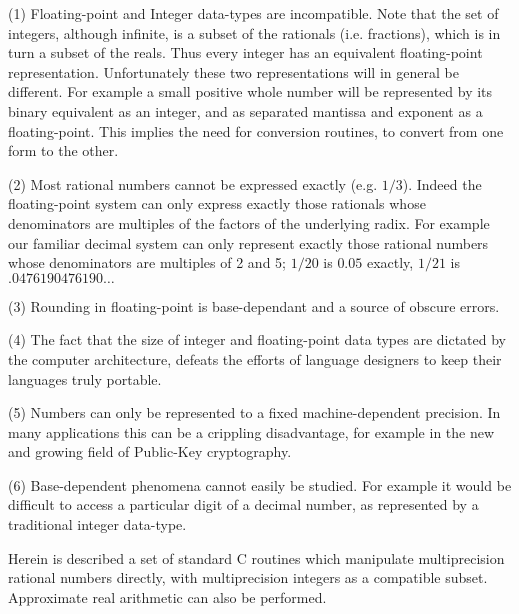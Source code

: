       \vspace{5mm}
      (1)   Floating-point  and  Integer  data-types  are   
      incompatible.  Note that the set of integers, although infinite, is a 
      subset of the rationals (i.e.  fractions),  which is in turn a subset 
      of the reals.  Thus every integer has  an  equivalent  floating-point 
      representation.  Unfortunately  these  two  representations  will  in 
      general be different.  For example a small positive whole number will 
      be  represented  by  its  binary  equivalent  as  an integer,  and as 
      separated mantissa and exponent as a floating-point. This implies the 
      need for conversion routines, to convert from one form to the other.  

      \vspace{5mm}
      (2) Most rational numbers cannot be expressed  exactly  (e.g.  $1/3$).  
      Indeed  the  floating-point  system  can  only  express exactly those 
      rationals whose denominators are multiples  of  the  factors  of  the 
      underlying  radix.  For  example our familiar decimal system can only 
      represent exactly  those  rational  numbers  whose  denominators  are 
      multiples of 2 and 5; $1/20$ is $0.05$ exactly, $1/21$ 
      is $.0476190476190\ldots$  

      \vspace{5mm}
      (3) Rounding in floating-point is  base-dependant  and  a  source  of 
      obscure errors.  

      \vspace{5mm}
      (4)  The  fact that the size of integer and floating-point data types 
      are dictated by the computer architecture,  defeats  the  efforts  of 
      language designers to keep their languages truly portable.  

      \vspace{5mm}
      (5)  Numbers  can  only  be  represented to a fixed machine-dependent 
      precision. In many applications this can be a crippling disadvantage, 
      for example in the new and growing field of Public-Key cryptography.  

      \vspace{5mm}
      (6) Base-dependent phenomena cannot easily be studied. For example it 
      would be difficult to access a particular digit of a decimal  number, 
      as  represented  by  a  traditional  integer  data-type.

      \vspace{5mm}
      Herein is described a set of standard  C  routines  which  manipulate 
      multiprecision  rational  numbers  directly,   with  multiprecision 
      integers as a compatible subset. Approximate real arithmetic can also 
      be performed.  

